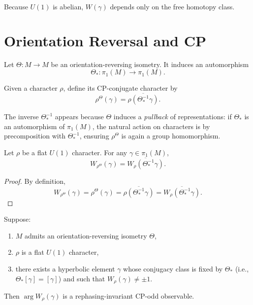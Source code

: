 \documentclass[epjc3]{svjour3}
\begin{document}
Because $U(1)$ is abelian, $W(\gamma)$ depends only on the
free homotopy class.

\section{Orientation Reversal and CP}

Let $\Theta : M \to M$ be an orientation-reversing isometry.
It induces an automorphism
\[
\Theta_* : \pi_1(M) \to \pi_1(M).
\]

\begin{definition}
Given a character $\rho$, define its CP-conjugate character by
\[
\rho^{\Theta}(\gamma)
=
\overline{\rho(\Theta_*^{-1}\gamma)}.
\]
\end{definition}

\begin{remark}
The inverse $\Theta_*^{-1}$ appears because $\Theta$ induces a
\emph{pullback} of representations: if $\Theta_*$ is an automorphism
of $\pi_1(M)$, the natural action on characters is by precomposition
with $\Theta_*^{-1}$, ensuring $\rho^\Theta$ is again a group homomorphism.
\end{remark}

\begin{lemma}
Let $\rho$ be a flat $U(1)$ character.
For any $\gamma \in \pi_1(M)$,
\[
W_{\rho^{\Theta}}(\gamma)
=
\overline{W_{\rho}(\Theta_*^{-1}\gamma)}.
\]
\end{lemma}

\begin{proof}
By definition,
\[
W_{\rho^{\Theta}}(\gamma)
=
\rho^{\Theta}(\gamma)
=
\overline{\rho(\Theta_*^{-1}\gamma)}
=
\overline{W_{\rho}(\Theta_*^{-1}\gamma)}.
\]
\end{proof}

\begin{theorem}
Suppose:
\begin{enumerate}
\item $M$ admits an orientation-reversing isometry $\Theta$,
\item $\rho$ is a flat $U(1)$ character,
\item there exists a hyperbolic element $\gamma$ whose conjugacy class
is fixed by $\Theta_*$ (i.e., $\Theta_*[\gamma] = [\gamma]$) and such that
$W_\rho(\gamma) \neq \pm 1$.
\end{enumerate}
Then $\arg W_\rho(\gamma)$ is a rephasing-invariant
CP-odd observable.
\end{theorem}
\end{document}
